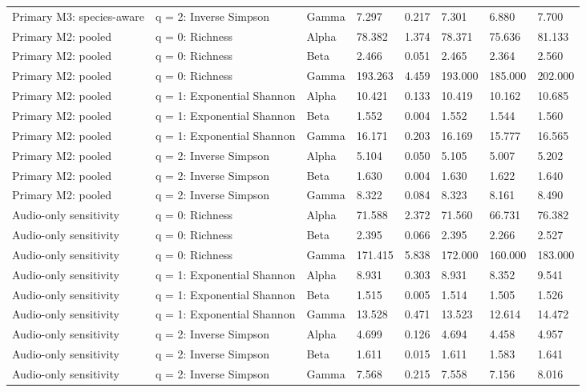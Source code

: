 \begin{landscape}
\begin{longtable}{L{4.0cm}L{2.5cm}L{1.6cm}*{5}{C{1.65cm}}}
Primary M3: species-aware & q = 2: Inverse Simpson & Gamma & 7.297 & 0.217 & 7.301 & 6.880 & 7.700 \\
Primary M2: pooled & q = 0: Richness & Alpha & 78.382 & 1.374 & 78.371 & 75.636 & 81.133 \\
Primary M2: pooled & q = 0: Richness & Beta & 2.466 & 0.051 & 2.465 & 2.364 & 2.560 \\
Primary M2: pooled & q = 0: Richness & Gamma & 193.263 & 4.459 & 193.000 & 185.000 & 202.000 \\
Primary M2: pooled & q = 1: Exponential Shannon & Alpha & 10.421 & 0.133 & 10.419 & 10.162 & 10.685 \\
Primary M2: pooled & q = 1: Exponential Shannon & Beta & 1.552 & 0.004 & 1.552 & 1.544 & 1.560 \\
Primary M2: pooled & q = 1: Exponential Shannon & Gamma & 16.171 & 0.203 & 16.169 & 15.777 & 16.565 \\
Primary M2: pooled & q = 2: Inverse Simpson & Alpha & 5.104 & 0.050 & 5.105 & 5.007 & 5.202 \\
Primary M2: pooled & q = 2: Inverse Simpson & Beta & 1.630 & 0.004 & 1.630 & 1.622 & 1.640 \\
Primary M2: pooled & q = 2: Inverse Simpson & Gamma & 8.322 & 0.084 & 8.323 & 8.161 & 8.490 \\
Audio-only sensitivity & q = 0: Richness & Alpha & 71.588 & 2.372 & 71.560 & 66.731 & 76.382 \\
Audio-only sensitivity & q = 0: Richness & Beta & 2.395 & 0.066 & 2.395 & 2.266 & 2.527 \\
Audio-only sensitivity & q = 0: Richness & Gamma & 171.415 & 5.838 & 172.000 & 160.000 & 183.000 \\
Audio-only sensitivity & q = 1: Exponential Shannon & Alpha & 8.931 & 0.303 & 8.931 & 8.352 & 9.541 \\
Audio-only sensitivity & q = 1: Exponential Shannon & Beta & 1.515 & 0.005 & 1.514 & 1.505 & 1.526 \\
Audio-only sensitivity & q = 1: Exponential Shannon & Gamma & 13.528 & 0.471 & 13.523 & 12.614 & 14.472 \\
Audio-only sensitivity & q = 2: Inverse Simpson & Alpha & 4.699 & 0.126 & 4.694 & 4.458 & 4.957 \\
Audio-only sensitivity & q = 2: Inverse Simpson & Beta & 1.611 & 0.015 & 1.611 & 1.583 & 1.641 \\
Audio-only sensitivity & q = 2: Inverse Simpson & Gamma & 7.568 & 0.215 & 7.558 & 7.156 & 8.016 \\
\end{longtable}
\end{landscape}
